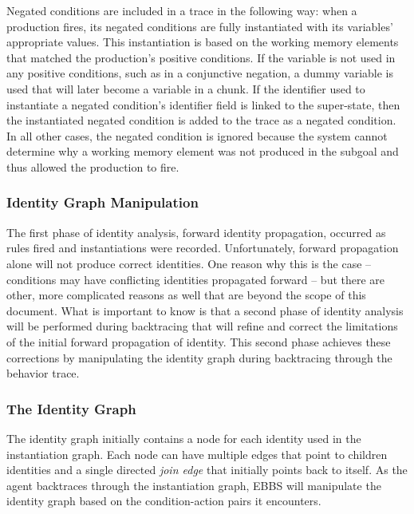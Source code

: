 Negated conditions are included in a trace in the following way: when a production fires, its negated conditions are fully instantiated with its variables' appropriate values. This instantiation is based on the working memory elements that matched the production's positive conditions. If the variable is not used in any positive conditions, such as in a conjunctive negation, a dummy variable is used that will later become a variable in a chunk.  If the identifier used to instantiate a negated condition's identifier field is linked to the super-state, then the instantiated negated condition is added to the trace as a negated condition. In all other cases, the negated condition is ignored because the system cannot determine why a working memory element was not produced in the subgoal and thus allowed the production to fire.

\subsubsection{Identity Graph Manipulation}

The first phase of identity analysis, forward identity propagation, occurred as rules fired and instantiations were recorded.  Unfortunately, forward propagation alone will not produce correct identities.  One reason why this is the case -- conditions may have conflicting identities propagated forward -- but there are other, more complicated reasons as well that are beyond the scope of this document. What is important to know is that a second phase of identity analysis will be performed during backtracing that will refine and correct the limitations of the initial forward propagation of identity. This second phase achieves these corrections by manipulating the identity graph during backtracing through the behavior trace.


\subsubsection*{The Identity Graph} %

The identity graph initially contains a node for each identity used in the instantiation graph.  Each node can have multiple edges that point to children identities and a single directed \textit{join edge} that initially points back to itself.  As the agent backtraces through the instantiation graph, EBBS will manipulate the identity graph based on the condition-action pairs it encounters.


